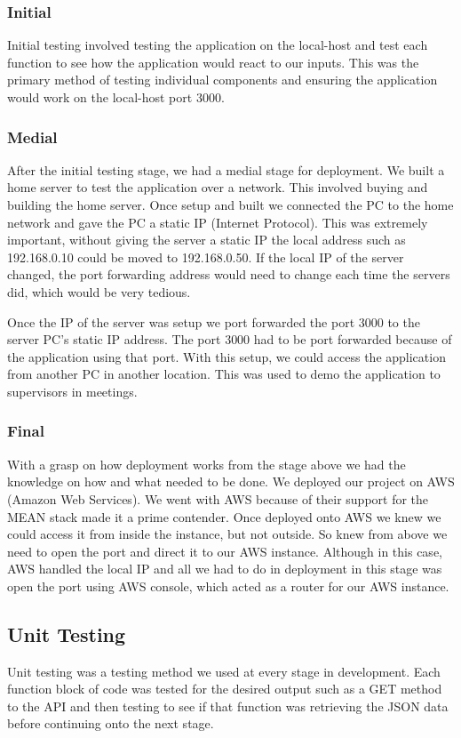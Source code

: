 \subsubsection{Initial}
Initial testing involved testing the application on the local-host and test each function to see how the application would react to our inputs. This was the primary method of testing individual components and ensuring the application would work on the local-host port 3000.

\subsubsection{Medial}
After the initial testing stage, we had a medial stage for deployment. We built a home server to test the application over a network. This involved buying and building the home server. Once setup and built we connected the PC to the home network and gave the PC a static IP (Internet Protocol). This was extremely important, without giving the server a static IP the local address such as 192.168.0.10 could be moved to 192.168.0.50. If the local IP of the server changed, the port forwarding address would need to change each time the servers did, which would be very tedious. 

Once the IP of the server was setup we port forwarded the port 3000 to the server PC's static IP address. The port 3000 had to be port forwarded because of the application using that port. With this setup, we could access the application from another PC in another location. This was used to demo the application to supervisors in meetings.

\subsubsection{Final}
With a grasp on how deployment works from the stage above we had the knowledge on how and what needed to be done. We deployed our project on AWS (Amazon Web Services). We went with AWS because of their support for the MEAN stack made it a prime contender. Once deployed onto AWS we knew we could access it from inside the instance, but not outside. So knew from above we need to open the port and direct it to our AWS instance. Although in this case, AWS handled the local IP and all we had to do in deployment in this stage was open the port using AWS console, which acted as a router for our AWS instance.

\subsection{Unit Testing}
Unit testing was a testing method we used at every stage in development. Each function block of code was tested for the desired output such as a GET method to the API and then testing to see if that function was retrieving the JSON data before continuing onto the next stage.

